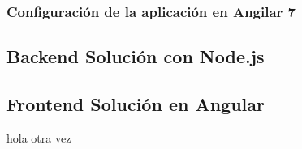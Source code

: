     \subsubsection{Configuración de la aplicación en Angilar 7}

    

    
    \subsection{Backend Solución con Node.js}


    \subsection{Frontend Solución en Angular}
    hola otra vez
